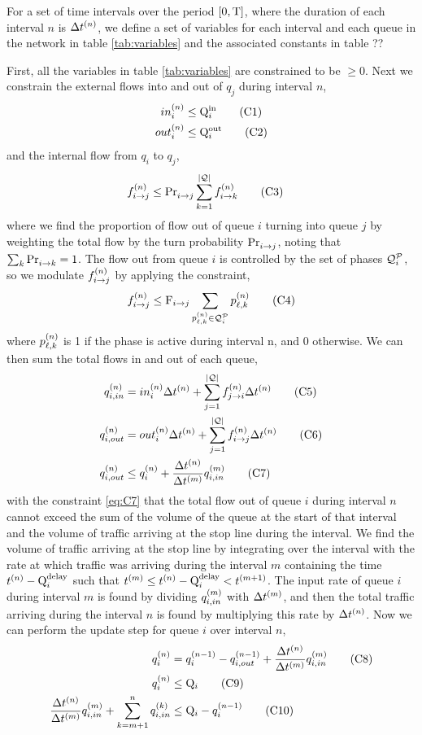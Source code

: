 For a set of time intervals over the period $[0,\TMAX]$, where the duration of
each interval $n$ is $\DT$, we define a set of variables for each interval and
each queue in the network in table \ref{tab:variables} and the associated
constants in table ?? %

First, all the variables in table \ref{tab:variables} are constrained to be $\ge
0$. Next we constrain the external flows into and out of $q_j$ during interval
$n$,
%
\begin{align}
\inq{i} &\le \QIN{i} \tag{C1}\label{eq:C1}\\        
\outq{i} &\le \QOUT{i} \tag{C2}\label{eq:C2}
\end{align}
%
and the internal flow from $q_i$ to $q_j$,
%
\begin{align}
\f{i}{j} &\le \FTURN{i}{j} \sum \limits_{k=1}^{\Qn}  \f{i}{k} \tag{C3}\label{eq:C3}
\end{align}
%
where we find the proportion of flow out of queue $i$ turning into queue $j$ by
weighting the total flow by the turn probability $\FTURN{i}{j}$, noting that
$\sum_k \FTURN{i}{k}=1$. The flow out from queue $i$ is controlled by the set of
phases $\QPset{i}$, so we modulate $\f{i}{j}$ by applying the constraint,
%
\begin{align}
\f{i}{j} \le \FMAX{i}{j} \sum \limits_{\p{\ell}{k} \in \QPset{i}} {\p{\ell}{k}} \tag{C4}\label{eq:C4}
\end{align}
%
where $\p{\ell}{k}$ is 1 if the phase is active during interval n, and 0
otherwise. We can then sum the total flows in and out of each queue,
%
\begin{align}
\qin{i} &= \inq{i} \DT + \sum \limits_{j=1}^{\Qn}  \f{j}{i} \DT   \tag{C5}\label{eq:C5} \\
\qout{i} &= \outq{i} \DT + \sum \limits_{j=1}^{\Qn}  \f{i}{j} \DT \tag{C6}\label{eq:C6}\\
\qout{i} &\le \q{i} + \frac{\DT[n]}{\DT[m]}\qin[m]{i}\tag{C7}\label{eq:C7}
\end{align}
%
with the constraint \ref{eq:C7} that the total flow out of queue $i$ during
interval $n$ cannot exceed the sum of the volume of the queue at the start of
that interval and the volume of traffic arriving at the stop line during the
interval. We find the volume of traffic arriving at the stop line by integrating
over the interval with the rate at which traffic was arriving during the
interval $m$ containing the time $\tn - \QDELAY{i}$ such that $\tn[m] \le
\tn-\QDELAY{i} < \tn[m+1]$. The input rate of queue $i$ during interval $m$ is
found by dividing $\qin[m]{i}$ with $\DT[m]$, and then the total traffic
arriving during the interval $n$ is found by multiplying this rate by $\DT$.
Now we can perform the update step for queue $i$ over interval $n$,
%
\begin{align}
\q{i} &= \q[n-1]{i} - \qout[n-1]{i} + \frac{\DT[n]}{\DT[m]}\qin[m]{i} \tag{C8}\label{eq:C8}\\
\q{i} &\le \QMAX{i} \tag{C9}\label{eq:C9}\\
 \frac{\DT[n]}{\DT[m]}\qin[m]{i}  + \sum \limits_{k=m+1}^n \qin[k]{i} &\le \QMAX{i} - \q[n-1]{i}\tag{C10}\label{eq:C10}
\end{align}


